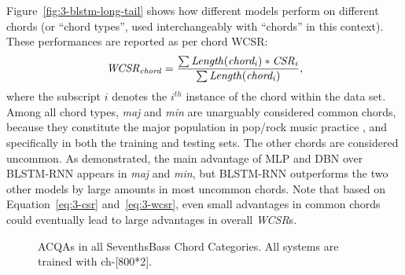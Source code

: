 Figure~\ref{fig:3-blstm-long-tail} shows how different models perform on different chords (or ``chord types'', used interchangeably with ``chords'' in this context). These performances are reported as per chord WCSR:
\begin{equation}
	\mathit{WCSR_{chord} = {\sum{Length(chord_i)*CSR_i} \over \sum{Length(chord_i)}}},
	\label{eq:3-wcsrchord}
\end{equation}
where the subscript $i$ denotes the $i^{th}$ instance of the chord within the data set. Among all chord types, \textit{maj} and \textit{min} are unarguably considered common chords, because they constitute the major population in pop/rock music practice \cite{burgoyne2011expert}, and specifically in both the training and testing sets. The other chords are considered uncommon. As demonstrated, the main advantage of MLP and DBN over BLSTM-RNN appears in \textit{maj} and \textit{min}, but BLSTM-RNN outperforms the two other models by large amounts in most uncommon chords. Note that based on Equation~\ref{eq:3-csr} and~\ref{eq:3-wcsr}, even small advantages in common chords could eventually lead to large advantages in overall \textit{WCSR}s.

\begin{figure}[htb]
	\centering
	\caption{ACQAs in all SeventhsBass Chord Categories. All systems are trained with ch-[800*2].}
	\label{fig:3-sumofsb}
\end{figure}

